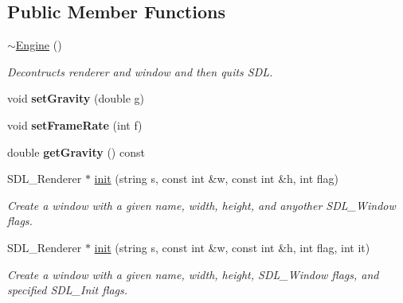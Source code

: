 \subsection*{Public Member Functions}
\begin{DoxyCompactItemize}
\item 
\mbox{\label{classEngine_a8ef7030a089ecb30bbfcb9e43094717a}} 
\hyperlink{classEngine_a8ef7030a089ecb30bbfcb9e43094717a}{$\sim$\+Engine} ()
\begin{DoxyCompactList}\small\item\em Decontructs renderer and window and then quits S\+DL. \end{DoxyCompactList}\item 
\mbox{\label{classEngine_ac2dab34eea67e7a2c006945ee71a9e42}} 
void {\bfseries set\+Gravity} (double g)
\item 
\mbox{\label{classEngine_a834148373d85dfc947ec3fcb366f25e6}} 
void {\bfseries set\+Frame\+Rate} (int f)
\item 
\mbox{\label{classEngine_a54694ab584e0d9fe82d1c25fb86c99e2}} 
double {\bfseries get\+Gravity} () const
\item 
\mbox{\label{classEngine_af02c5fcfad817c5c8bc0a3cacfd9d4f8}} 
S\+D\+L\+\_\+\+Renderer $\ast$ \hyperlink{classEngine_af02c5fcfad817c5c8bc0a3cacfd9d4f8}{init} (string s, const int \&w, const int \&h, int flag)
\begin{DoxyCompactList}\small\item\em Create a window with a given name, width, height, and anyother S\+D\+L\+\_\+\+Window flags. \end{DoxyCompactList}\item 
\mbox{\label{classEngine_aca16d18226665d75acad41b48a8da989}} 
S\+D\+L\+\_\+\+Renderer $\ast$ \hyperlink{classEngine_aca16d18226665d75acad41b48a8da989}{init} (string s, const int \&w, const int \&h, int flag, int it)
\begin{DoxyCompactList}\small\item\em Create a window with a given name, width, height, S\+D\+L\+\_\+\+Window flags, and specified S\+D\+L\+\_\+\+Init flags. \end{DoxyCompactList}\item 

\end{DoxyCompactItemize}
